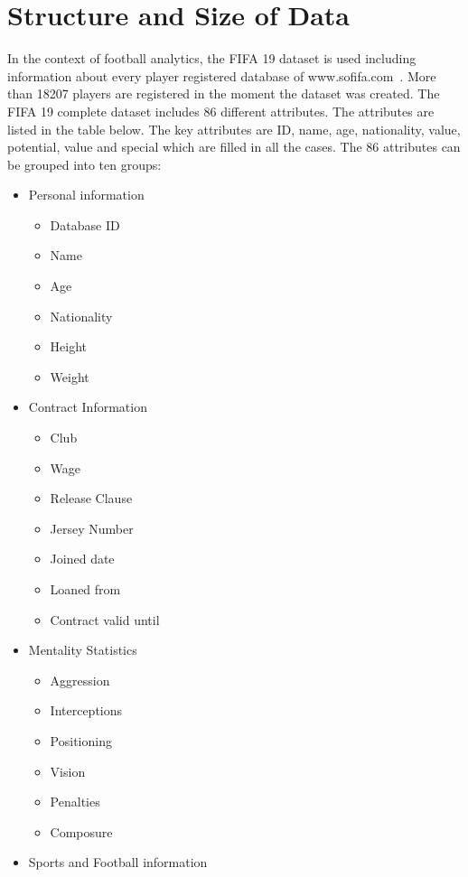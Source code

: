 \section{Structure and Size of Data}
In the context of football analytics, the FIFA 19 dataset is used including information about every player registered database of www.sofifa.com~\cite{ref_sofifa}. More than 18207 players are registered in the moment the dataset was created. The FIFA 19 complete dataset includes 86 different attributes. The attributes are listed in the table below. \newline
The key attributes are ID, name, age, nationality, value, potential, value and special which are filled in all the cases. The 86 attributes can be grouped into ten groups:


\setlength{\columnseprule}{0.4pt}
\begin{multicols}{3}
\begin{itemize}
\item	Personal information
\begin{itemize}
\item	Database ID
\item	Name
\item	Age
\item	Nationality
\item	Height 
\item	Weight
\end{itemize}
\item	Contract Information
\begin{itemize}
\item	Club
\item	Wage
\item	Release Clause
\item	Jersey Number
\item	Joined date
\item	Loaned from
\item	Contract valid until
\end{itemize}
\item	Mentality Statistics
\begin{itemize}
\item	Aggression
\item	Interceptions
\item	Positioning
\item	Vision
\item	Penalties
\item	Composure
\columnbreak
\end{itemize}
\item	Sports and Football information

\end{itemize}
\end{multicols}
